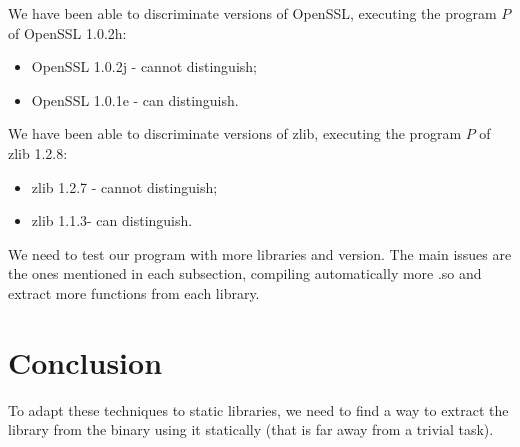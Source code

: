 \documentclass{article}
\begin{document}
        We have been able to discriminate versions of OpenSSL, executing the
        program $P$ of OpenSSL 1.0.2h:
        \begin{itemize}
            \item OpenSSL 1.0.2j - cannot distinguish; 
            \item OpenSSL 1.0.1e - can distinguish.
        \end{itemize}


        We have been able to discriminate versions of zlib, executing the
        program $P$ of zlib 1.2.8: 
        \begin{itemize}
            \item zlib 1.2.7 - cannot distinguish; 
            \item zlib 1.1.3- can distinguish.
        \end{itemize}


   	
        We need to test our program with more libraries and version. The main
        issues are the ones mentioned in each subsection, compiling
        automatically more .so and extract more functions from each library.

    
    \section{Conclusion}
    To adapt
    these techniques to static libraries, we need to find a way to extract the
    library from the binary using it statically (that is far away from a
    trivial task). 
    

\iffalse    
    \subsection{Other tools}

		\subsubsection{Coccinelle} 
            Coccinelle uses static analysis to find pattern in C source code.
            Using a known bug as a pattern leads to discover if the patch was
            applied or not. It seems not to be interesting in our case,
            because we deal with binaries.  
        \subsubsection{n-gram}
\fi
\end{document}
